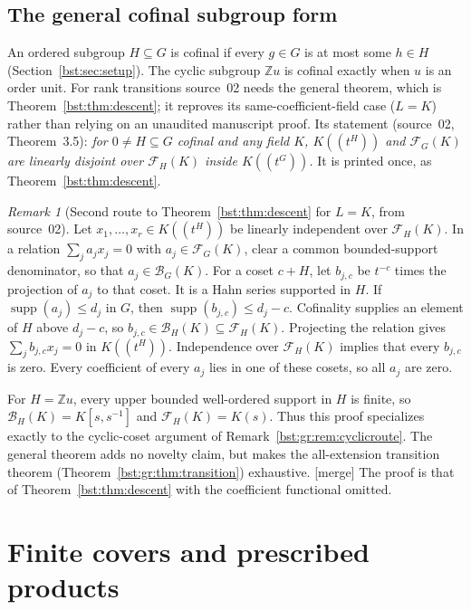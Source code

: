 \documentclass[11pt,letterpaper]{article}
\theoremstyle{definition}
\theoremstyle{remark}
\newtheorem{remark}[theorem]{Remark}
\newcommand{\Z}{\mathbb Z}
\newcommand{\supp}{\operatorname{supp}}
\newcommand{\HH}[2]{#1((t^{#2}))}
\newcommand{\BB}[2]{\mathcal B_{#2}(#1)}
\newcommand{\FF}[2]{\mathcal F_{#2}(#1)}
\begin{document}
\subsection{The general cofinal subgroup form}

An ordered subgroup $H\subseteq G$ is cofinal if every $g\in G$ is at most
some $h\in H$ (Section~\ref{bst:sec:setup}). The cyclic subgroup $\Z u$ is
cofinal exactly when $u$ is an order unit. For rank transitions source~02
needs the general theorem, which is Theorem~\ref{bst:thm:descent}; it
reproves its same-coefficient-field case ($L=K$) rather than relying on an
unaudited manuscript proof. Its statement (source~02, Theorem~3.5):
\emph{for $0\ne H\subseteq G$ cofinal and any field $K$, $\HH KH$ and $\FF KG$
are linearly disjoint over $\FF KH$ inside $\HH KG$.} It is printed once,
as Theorem~\ref{bst:thm:descent}.

\begin{remark}[Second route to Theorem~\ref{bst:thm:descent} for $L=K$, from source~02]\label{bst:gr:rem:cofinalroute}
Let $x_1,\ldots,x_r\in\HH KH$ be linearly independent over $\FF KH$. In a
relation $\sum_ja_jx_j=0$ with $a_j\in\FF KG$, clear a common bounded-support
denominator, so that $a_j\in\BB KG$. For a coset $c+H$, let $b_{j,c}$ be
$t^{-c}$ times the projection of $a_j$ to that coset. It is a Hahn series
supported in $H$. If $\supp(a_j)\leq d_j$ in $G$, then
$\supp(b_{j,c})\leq d_j-c$. Cofinality supplies an element of $H$ above
$d_j-c$, so $b_{j,c}\in\BB KH\subseteq\FF KH$. Projecting the relation gives
$\sum_jb_{j,c}x_j=0$ in $\HH KH$. Independence over $\FF KH$ implies that
every $b_{j,c}$ is zero. Every coefficient of every $a_j$ lies in one of these
cosets, so all $a_j$ are zero.

For $H=\Z u$, every upper bounded well-ordered support in $H$ is finite, so
$\BB KH=K[s,s^{-1}]$ and $\FF KH=K(s)$. Thus this proof specializes exactly
to the cyclic-coset argument of Remark~\ref{bst:gr:rem:cyclicroute}. The
general theorem adds no novelty claim, but makes the all-extension
transition theorem (Theorem~\ref{bst:gr:thm:transition}) exhaustive.
\textup{[merge]} The proof is that of Theorem~\ref{bst:thm:descent} with the
coefficient functional omitted.
\end{remark}

\section{Finite covers and prescribed products}\label{bst:gr:sec:covers}
\end{document}
